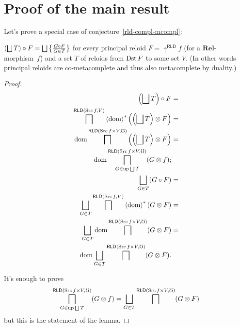 \section{Proof of the main result}
Let's prove a special case of conjecture~\ref{rld-compl-mcompl}:
\begin{thm}
$\left(\bigsqcup T\right)\circ F=\bigsqcup\setcond{G\circ F}{G\in T}$
for every principal reloid $F=\uparrow^{\mathsf{RLD}}f$ (for a $\mathbf{Rel}$-morphism~$f$)
and a set $T$ of reloids from $\operatorname{Dst} F$ to some set $V$. (In other
words principal reloids are co-metacomplete and thus also metacomplete
by duality.)\end{thm}
\begin{proof}
~
\begin{align*}
\left(\bigsqcup T\right)\circ F & =\\
\bigsqcap^{\mathsf{RLD}(\Src f,V)}\rsupfun{\dom}\left(\left(\bigsqcup T\right)\otimes F\right) & =\\
\dom\bigsqcap^{\mathsf{RLD}(\Src f\times V,\mho)}\left(\left(\bigsqcup T\right)\otimes F\right) & =\\
\dom\bigsqcap_{G\in\up\bigsqcup T}^{\mathsf{RLD}(\Src f\times V,\mho)}(G\otimes f);\\
\bigsqcup_{G\in T}(G\circ F) & =\\
\bigsqcup_{G\in T}\bigsqcap^{\mathsf{RLD}(\Src f,V)}\rsupfun{\dom}(G\otimes F) & =\\
\bigsqcup_{G\in T}\dom\bigsqcap^{\mathsf{RLD}(\Src f\times V,\mho)}(G\otimes F) & =\\
\dom\bigsqcup_{G\in T}\bigsqcap^{\mathsf{RLD}(\Src f\times V,\mho)}(G\otimes F).
\end{align*}


It's enough to prove
\[
\bigsqcap_{G\in\up\bigsqcup T}^{\mathsf{RLD}(\Src f\times V,\mho)}(G\otimes f)=\bigsqcup_{G\in T}\bigsqcap^{\mathsf{RLD}(\Src f\times V,\mho)}(G\otimes F)
\]
but this is the statement of the lemma.
\end{proof}

